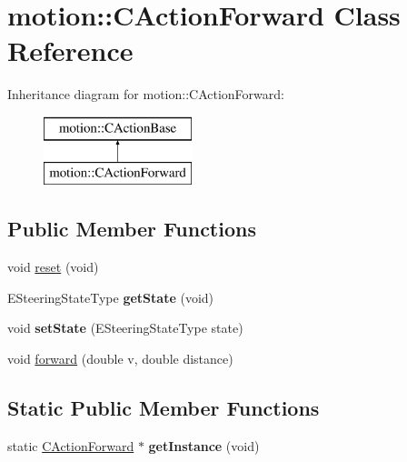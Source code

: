 \hypertarget{classmotion_1_1CActionForward}{}\section{motion\+:\+:C\+Action\+Forward Class Reference}
\label{classmotion_1_1CActionForward}
Inheritance diagram for motion\+:\+:C\+Action\+Forward\+:\begin{figure}[H]
\begin{center}
\leavevmode
\includegraphics[height=2.000000cm]{classmotion_1_1CActionForward}
\end{center}
\end{figure}
\subsection*{Public Member Functions}
\begin{DoxyCompactItemize}
\item 
void \mbox{\hyperlink{classmotion_1_1CActionForward_af7c72ffee0c2f41c8608259ef3268f23}{reset}} (void)
\item 
\mbox{\label{classmotion_1_1CActionForward_af986e75f2773dced403311b3e5e1d7b8}} 
E\+Steering\+State\+Type {\bfseries get\+State} (void)
\item 
\mbox{\label{classmotion_1_1CActionForward_a0a17ba177738541886131deca36c6bf1}} 
void {\bfseries set\+State} (E\+Steering\+State\+Type state)
\item 
void \mbox{\hyperlink{classmotion_1_1CActionForward_abc4d3b39f49514f9d3f64a92393aa6d2}{forward}} (double v, double distance)
\end{DoxyCompactItemize}
\subsection*{Static Public Member Functions}
\begin{DoxyCompactItemize}
\item 
\mbox{\label{classmotion_1_1CActionForward_a7820340aa671aaf37c16b945f023b82f}} 
static \mbox{\hyperlink{classmotion_1_1CActionForward}{C\+Action\+Forward}} $\ast$ {\bfseries get\+Instance} (void)
\end{DoxyCompactItemize}


